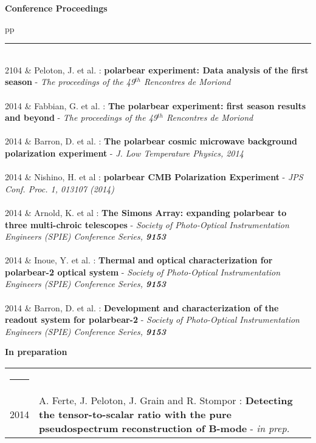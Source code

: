 \documentclass[a4paper,oneside]{article}
\newcommand{\ligne}[1]{\rule[0.5ex]{\textwidth}{#1}\\}
\newcommand{\interRubrique}{\bigskip}
\newcommand{\styleRub}[1]{\noindent\textbf{\large #1}\par}
\newcommand{\indentStd}{\noindent\hspace{\lenA}}
\newenvironment{rubrique}[2][\linewidth] {
    \styleRub{#2}
    \setlength{\lenB}{#1}
    \setlength{\lenC}{\linewidth}
    \addtolength{\lenC}{-\lenA}
    \addtolength{\lenC}{-\lenB}
    \addtolength{\lenC}{-\parindent}
    \addtolength{\lenC}{-9pt}
    \indentStd\begin{tabular}[t]{p{\lenB}p{\lenC}}
}
{\end{tabular}}
\newcommand{\lieu}[1]{\small{\textsl{#1}\ }}
\begin{document}
\begin{rubrique}[3.4cm]{Conference Proceedings}
    \ligne{0.1mm}

2104
& Peloton, J. et al. : \textbf{{\sc polarbear} experiment:  Data analysis of the first season} - \lieu{The proceedings of the 49$^{th}$ Rencontres de Moriond}\\ \\

2014
& Fabbian, G. et al. : \textbf{The {\sc polarbear} experiment: first season results and beyond} - \lieu{The proceedings of the 49$^{th}$ Rencontres de Moriond}\\ \\
    
2014
& Barron, D. et al. : \textbf{The {\sc polarbear} cosmic microwave background polarization experiment} - \lieu{J. Low Temperature Physics, 2014}\\ \\

2014
& Nishino, H. et al : \textbf{{\sc polarbear} CMB Polarization Experiment} - \lieu{JPS Conf. Proc. 1, 013107 (2014)}\\ \\

2014
& Arnold, K. et al : \textbf{The {\sc Simons Array}: expanding {\sc polarbear} to three multi-chroic telescopes} - \lieu{Society of Photo-Optical Instrumentation Engineers (SPIE) Conference Series, {\bf{9153}}} \\ \\

2014
& Inoue, Y. et al. : \textbf{Thermal and optical characterization for {\sc polarbear}-2 optical system} - \lieu{Society of Photo-Optical Instrumentation Engineers (SPIE) Conference Series, {\bf{9153}}} \\ \\

2014
& Barron, D. et al. : \textbf{Development and characterization of the readout system for {\sc polarbear}-2} - \lieu{Society of Photo-Optical Instrumentation Engineers (SPIE) Conference Series, {\bf 9153}}  \\ 

\end{rubrique}

\interRubrique

\begin{rubrique}[3.4cm]{In preparation}
    \ligne{0.1mm}

2014
& A. Ferte, J. Peloton, J. Grain and R. Stompor : \textbf{Detecting the tensor-to-scalar ratio with the pure pseudospectrum reconstruction of B-mode} - \lieu{in prep.} \\

\end{rubrique}
\end{document}
